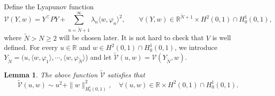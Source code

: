 \documentclass[review]{elsarticle}
\newtheorem{lemma}[theorem]{Lemma}
\numberwithin{equation}{section}
\begin{document}
Define the Lyapunov function
\begin{equation*}
    \label{Lyapunov}
    \mathcal{V}(Y, w)= Y^{\top} P Y+\sum_{n=\tilde{N}+1}^{\infty} \lambda_n \langle w,\varphi_n\rangle^2, \quad \quad \forall (Y, w)\in \mathbb{R}^{\tilde{N}+1}\times H^2(0,1)\cap H^1_0(0,1),
\end{equation*}
where $\tilde{N}>N\ge 2$ will be chosen later. It is not hard to check that $V$ is well defined. {For every $u\in \mathbb{R}$ and $w\in H^2(0,1)\cap H^1_0(0,1)$, we introduce $Y_{\tilde{N}}=(u, \langle w,\varphi_1\rangle,\cdots,\langle w,\varphi_{\tilde{N}}\rangle$) and let $\tilde{\mathcal{V}}(u,w)=\mathcal{V}(Y_{\tilde{N}},w)$.}
\begin{lemma}
\label{h1norm-v}
  The above function $\tilde{\mathcal{V}}$ satisfies that
    \begin{equation}
        \label{VwH1}
       \tilde{\mathcal{V}}(u,w)\sim u^2+\|w\|^2_{H^1_0(0,1)},\quad \forall (u,w)\in \mathbb{R}\times H^2(0,1)\cap H^1_0(0,1).
    \end{equation}
\end{lemma}
\end{document}

